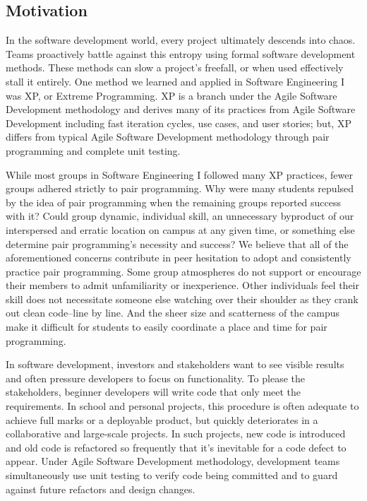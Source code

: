 
\subsection{Motivation}
In the software development world, every project ultimately descends into chaos. Teams proactively battle against this entropy using formal software development methods. These methods can slow a project's freefall, or when used effectively stall it entirely. One method we learned and applied in Software Engineering I was XP, or Extreme Programming. XP is a branch under the Agile Software Development methodology and derives many of its practices from Agile Software Development including fast iteration cycles, use cases, and user stories; but, XP differs from typical Agile Software Development methodology through pair programming and complete unit testing. 

While most groups in Software Engineering I followed many XP practices, fewer groups adhered strictly to pair programming. Why were many students repulsed by the idea of pair programming when the remaining groups reported success with it? Could group dynamic, individual skill, an unnecessary byproduct of our interspersed and erratic location on campus at any given time, or something else determine pair programming’s necessity and success? We believe that all of the aforementioned concerns contribute in peer hesitation to adopt and consistently practice pair programming. Some group atmospheres do not support or encourage their members to admit unfamiliarity or inexperience. Other individuals feel their skill does not necessitate someone else watching over their shoulder as they crank out clean code–line by line. And the sheer size and scatterness of the campus make it difficult for students to easily coordinate a place and time for pair programming. 

In software development, investors and stakeholders want to see visible results and often pressure developers to focus on functionality. To please the stakeholders, beginner developers will write code that only meet the requirements. In school and personal projects, this procedure is often adequate to achieve full marks or a deployable product, but quickly deteriorates in a collaborative and large-scale projects. In such projects, new code is introduced and old code is refactored so frequently that it's inevitable for a code defect to appear. Under Agile Software Development methodology, development teams simultaneously use unit testing to verify code being committed and to guard against future refactors and design changes.

